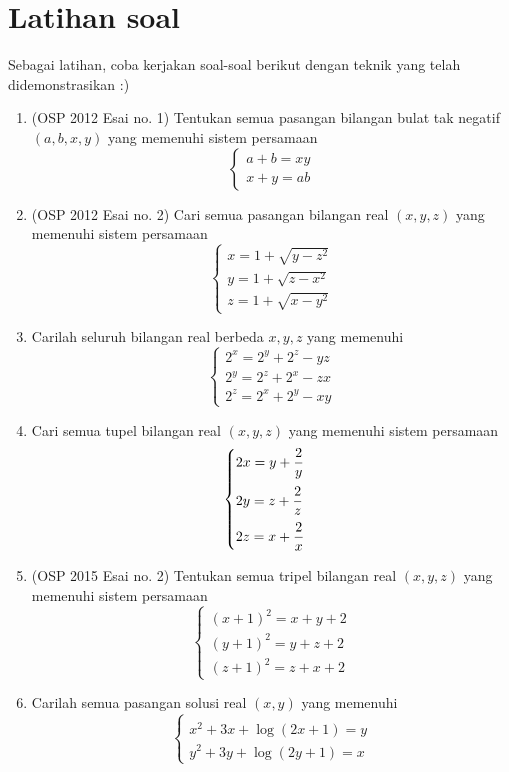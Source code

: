\documentclass[11pt]{scrartcl}
\begin{document}
\section{Latihan soal}
Sebagai latihan, coba kerjakan soal-soal berikut dengan teknik yang telah didemonstrasikan :)

\begin{enumerate}
    \item (OSP 2012 Esai no. 1) Tentukan semua pasangan bilangan bulat tak negatif $(a,b,x,y)$ yang memenuhi sistem persamaan\\[-10pt] 
		$$\begin{cases}
			a+b=xy \\
			x+y=ab 
		\end{cases}$$
		
    \item (OSP 2012 Esai no. 2) Cari semua pasangan bilangan real $(x,y,z)$ yang memenuhi sistem persamaan\\[-10pt] 
		$$\begin{cases}
			x=1+\sqrt{y-z^2} \\
			y=1+\sqrt{z-x^2} \\
			z=1+\sqrt{x-y^2}
		\end{cases}$$
		
	\item Carilah seluruh bilangan real berbeda $x,y,z$ yang memenuhi \\[-10pt] 
	$$\begin{cases}
			2^x=2^y+2^z-yz \\
			2^y=2^z+2^x-zx \\
			2^z=2^x+2^y-xy
		\end{cases}$$
		
	\item Cari semua tupel bilangan real $(x,y,z)$ yang memenuhi sistem persamaan\\[-10pt] 
		$$\begin{cases}
			\vspace{2mm}
			2x=y+\dfrac{2}{y} \\
			\vspace{2mm}
			2y=z+\dfrac{2}{z} \\
			2z=x+\dfrac{2}{x}
		\end{cases}$$
		
	\item (OSP 2015 Esai no. 2) Tentukan semua tripel bilangan real $(x,y,z)$ yang memenuhi sistem persamaan\\[-10pt]
	    $$\begin{cases}
			(x+1)^2 = x+y+2 \\
			(y+1)^2 = y+z+2 \\
			(z+1)^2 = z+x+2
		\end{cases}$$
		
	\item Carilah semua pasangan solusi real $(x,y)$ yang memenuhi\\[-10pt] 
				 		$$\begin{cases}\\[-30pt]
				 		x^2+3x+\log(2x+1)=y \\[-5pt]
				 		y^2+3y+\log(2y+1)=x
				 		\end{cases}$$
\end{enumerate}
\end{document}
